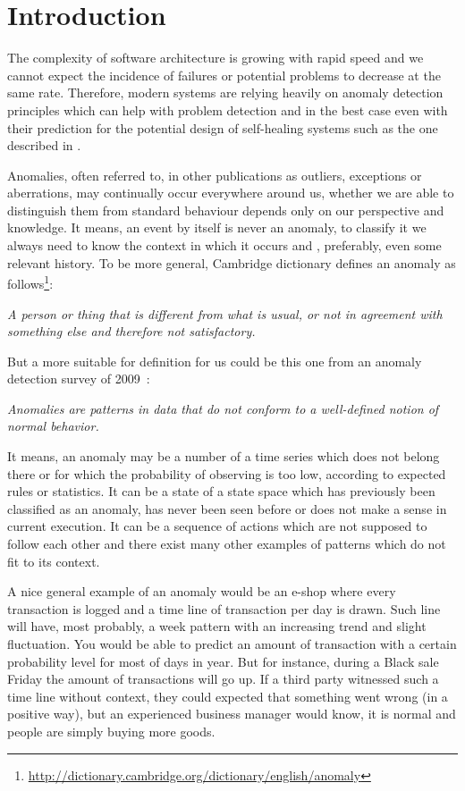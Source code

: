 \chapter{Introduction}

The complexity of software architecture is growing with rapid speed and we cannot expect the incidence of failures or potential problems to decrease at the same rate. Therefore, modern systems are relying heavily on anomaly detection principles which can help with problem detection and in the best case even with their prediction for the potential design of self-healing systems such as the one described in \cite{dashofy2002towards}.

Anomalies, often referred to, in other publications as outliers, exceptions or aberrations, may continually occur everywhere around us, whether we are able to distinguish them from standard behaviour depends only on our perspective and knowledge. It means, an event by itself is never an anomaly, to classify it we always need to know the context in which it occurs and , preferably, even some relevant history. To be more general, Cambridge dictionary defines an anomaly as follows\footnote{\url{http://dictionary.cambridge.org/dictionary/english/anomaly}}:

\begin{center}\textit{A person or thing that is different from what is usual, or not in agreement with something else and therefore not satisfactory. }
\end{center}

But a more suitable for definition for us could be this one from an anomaly detection survey of 2009~\cite{chandola2009anomaly}:

\begin{center}
\textit{Anomalies are patterns in data that do not conform to a well-defined notion of normal behavior.}
\end{center}

It means, an anomaly may be a number of a time series which does not belong there or for which the probability of observing is too low, according to expected rules or statistics. It can be a state of a state space which has previously been classified as an anomaly, has never been seen before or does not make a sense in current execution. It can be a sequence of actions which are not supposed to follow each other and there exist many other examples of patterns which do not fit to its context.

A nice general example of an anomaly would be an e-shop where every transaction is logged and a time line of transaction per day is drawn. Such line will have, most probably, a week pattern with an increasing trend and slight fluctuation. You would be able to predict an amount of transaction with a certain probability level for most of days in year. But for instance, during a Black sale Friday the amount of transactions will go up. If a third party witnessed such a time line without context, they could expected that something went wrong (in a positive way), but an experienced business manager would know, it is normal and people are simply buying more goods.

